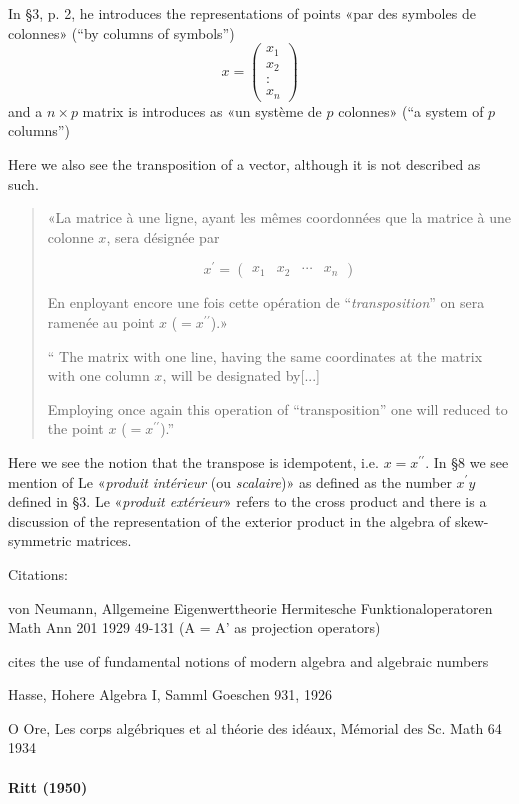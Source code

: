 In \S 3, p. 2, he introduces the representations of points «par des symboles de colonnes» (``by columns of symbols'')
\[
x =\begin{pmatrix}x_1\\x_2\\:\\x_n\end{pmatrix}
\]
and a $n \times p$ matrix is introduces as «un système de $p$ colonnes» (``a system of $p$ columns'')

Here we also see the transposition of a vector, although it is not described as such.
\begin{quote}
«La matrice à une ligne, ayant les mêmes coordonnées que la matrice à une colonne $x$, sera désignée par

\[
x^\prime = \begin{pmatrix}x_1 & x_2 & \cdots & x_n\end{pmatrix}
\]

En enployant encore une fois cette opération de ``\textit{transposition}'' on sera ramenée au point $x$ ($= x^{\prime\prime}$).»

``
The matrix with one line, having the same coordinates at the matrix with one column $x$, will be designated by[...]

Employing once again this operation of ``transposition'' one will reduced to the point $x$ ($= x^{\prime\prime}$).''

\end{quote}
Here we see the notion that the transpose is idempotent, i.e. $x = x^{\prime\prime}$.
In \S 8 we see mention of Le «\textit{produit intérieur} (ou \textit{scalaire})» as defined as the number $x^\prime y$ defined in \S 3. Le «\textit{produit extérieur}» refers to the cross product and there is a discussion of the representation of the exterior product in the algebra of skew-symmetric matrices.

Citations:

von Neumann, Allgemeine Eigenwerttheorie Hermitesche Funktionaloperatoren
Math Ann 201 1929 49-131 (A = A' as projection operators)

cites the use of fundamental notions of modern algebra and algebraic numbers

Hasse, Hohere Algebra I, Samml  Goeschen 931, 1926

O Ore, Les corps algébriques et al théorie des idéaux, Mémorial des Sc. Math 64 1934




\paragraph{Ritt (1950)~\cite{Ritt1950}}

